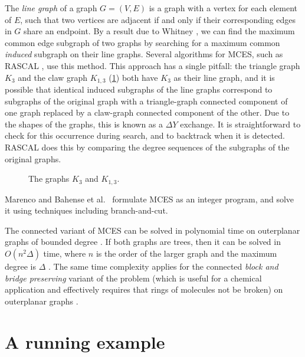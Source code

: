 The \emph{line graph} of a graph $G=(V,E)$ is a graph with a vertex for each element
of $E$, such that two vertices are adjacent if and only if their corresponding edges
in $G$ share an endpoint.
By a result due to Whitney \cite{whitney1932congruent}, we can find the maximum common
edge subgraph of two graphs by searching for a maximum common
\textit{induced} subgraph on their line graphs.
Several algorithms for MCES, such as RASCAL
\cite{DBLP:journals/cj/RaymondGW02}, use this method.
This approach has a single pitfall:
the triangle graph $K_3$ and the claw graph $K_{1,3}$ (\cref{fig:k3-and-claw}) both have $K_3$ as their line graph,
and it is possible that identical induced subgraphs of the line graphs correspond to subgraphs
of the original graph with a triangle-graph connected component of one graph replaced by a claw-graph
connected component of the other.  Due to the shapes of the graphs, this is known as a $\Delta Y$ exchange.
It is straightforward to check for this occurrence during search, and to backtrack when it is detected.
RASCAL does this by comparing the degree sequences of the subgraphs of the original graphs.

\begin{figure}[htb]
    \centering
    
    \caption{The graphs $K_3$ and $K_{1,3}$.}
    \label{fig:k3-and-claw}
\end{figure}

Marenco \cite{marenco1999algoritmo} and Bahense et al.\ \cite{DBLP:journals/dam/BahienseMPS12}
formulate MCES as an integer program, and solve it using techniques including branch-and-cut.

The connected variant of MCES can be solved in polynomial time on outerplanar
graphs of bounded degree \cite{DBLP:journals/algorithms/AkutsuT13}.  If both
graphs are trees, then it can be solved in $O(n^2\Delta)$ time, where $n$ is
the order of the larger graph and the maximum degree is $\Delta$
\cite{DBLP:conf/mfcs/DroschinskyKM16}.  The same time complexity applies for the
connected \emph{block and bridge preserving} variant of the problem (which
is useful for a chemical application and effectively requires that rings of molecules not be broken)
on outerplanar graphs \cite{DBLP:conf/sofsem/DroschinskyKM17}.

\section{A running example}\label{sec:running-example}

